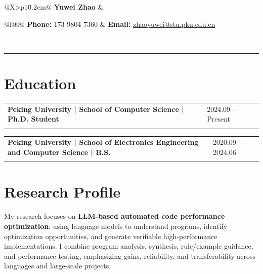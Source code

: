 \documentclass[10pt,a4paper]{article}
\makeatletter
\newcommand{\datedentry}[3]{%
  \begin{tabularx}{\textwidth}{@{}>{\bfseries}X>{\raggedleft\arraybackslash}p{3.2cm}@{}}
    #1 & \textcolor{muted}{#2}\\[-1pt]
    \multicolumn{2}{@{}>{\raggedright\arraybackslash}p{\textwidth}@{}}{\textcolor{muted}{#3}}
  \end{tabularx}
}
\makeatother
\begin{document}
\begin{tabularx}{\textwidth}{@{}X>{\raggedleft\arraybackslash}p{10.2cm}@{}}
  {\fontsize{25}{28}\selectfont\bfseries Yuwei Zhao}
  & {\small
      \begin{tabular}{@{}l@{\hspace{1.1em}}l@{}}
        \textbf{Phone:} 173 9804 7360 &
        \textbf{Email:} \href{mailto:zhaoyuwei@stu.pku.edu.cn}{zhaoyuwei@stu.pku.edu.cn}\\[-1pt]
      \end{tabular}
    }\\
\end{tabularx}

\vspace{4pt}
{\color{msblue}\rule{\textwidth}{1.35pt}}\par

\section{Education}
\datedentry{Peking University | School of Computer Science | Ph.D. Student}{2024.09 -- Present}{Advisor: Prof. Yingfei Xiong}
\vspace{4pt}
\datedentry{Peking University | School of Electronics Engineering and Computer Science | B.S.}{2020.09 -- 2024.06}{Major: Information and Computing Science | Thesis: Automatic Synthesis of Dynamic Programming Algorithms via Abstract Interpretation}

\section{Research Profile}
My research focuses on \textbf{LLM-based automated code performance optimization}: using language models to understand programs, identify optimization opportunities, and generate verifiable high-performance implementations. I combine program analysis, synthesis, rule/example guidance, and performance testing, emphasizing gains, reliability, and transferability across languages and large-scale projects.
\end{document}
